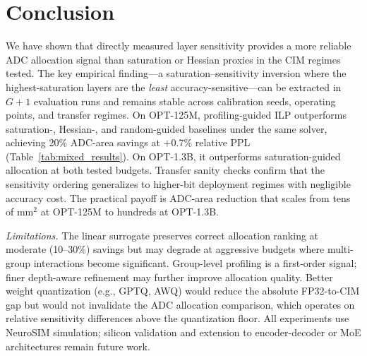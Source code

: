 \documentclass[sigconf,review,anonymous]{acmart}
\begin{document}
\FloatBarrier
\section{Conclusion}
\label{sec:conclusion}

We have shown that directly measured layer sensitivity provides a more reliable ADC allocation signal than saturation or Hessian proxies in the CIM regimes tested.
The key empirical finding---a saturation--sensitivity inversion where the highest-saturation layers are the \emph{least} accuracy-sensitive---can be extracted in $G{+}1$ evaluation runs and remains stable across calibration seeds, operating points, and transfer regimes.
On OPT-125M, profiling-guided ILP outperforms saturation-, Hessian-, and random-guided baselines under the same solver, achieving 20\% ADC-area savings at $+$0.7\% relative PPL (Table~\ref{tab:mixed_results}).
On OPT-1.3B, it outperforms saturation-guided allocation at both tested budgets.
Transfer sanity checks confirm that the sensitivity ordering generalizes to higher-bit deployment regimes with negligible accuracy cost.
The practical payoff is ADC-area reduction that scales from tens of mm$^2$ at OPT-125M to hundreds at OPT-1.3B.

\textit{Limitations.}
The linear surrogate preserves correct allocation ranking at moderate (10--30\%) savings but may degrade at aggressive budgets where multi-group interactions become significant.
Group-level profiling is a first-order signal; finer depth-aware refinement may further improve allocation quality.
Better weight quantization (e.g., GPTQ, AWQ) would reduce the absolute FP32-to-CIM gap but would not invalidate the ADC allocation comparison, which operates on relative sensitivity differences above the quantization floor.
All experiments use NeuroSIM simulation; silicon validation and extension to encoder-decoder or MoE architectures remain future work.



\end{document}
